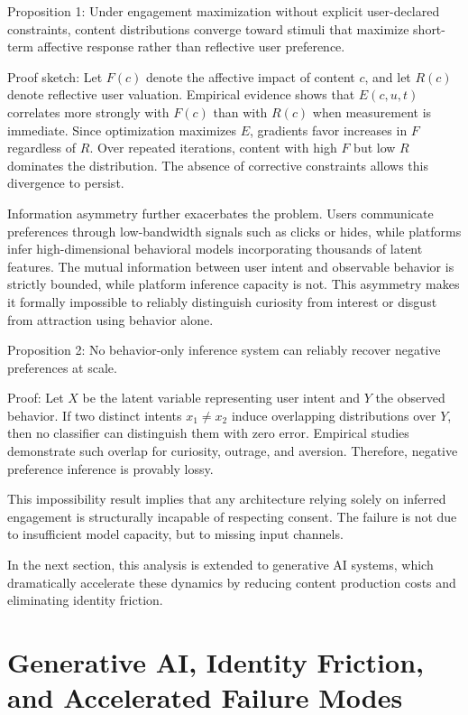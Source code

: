 \documentclass[11pt,oneside]{article}
\begin{document}
Proposition 1: Under engagement maximization without explicit user-declared constraints, content distributions converge toward stimuli that maximize short-term affective response rather than reflective user preference.

Proof sketch: Let \( F(c) \) denote the affective impact of content \( c \), and let \( R(c) \) denote reflective user valuation. Empirical evidence shows that \( E(c,u,t) \) correlates more strongly with \( F(c) \) than with \( R(c) \) when measurement is immediate. Since optimization maximizes \( E \), gradients favor increases in \( F \) regardless of \( R \). Over repeated iterations, content with high \( F \) but low \( R \) dominates the distribution. The absence of corrective constraints allows this divergence to persist.

Information asymmetry further exacerbates the problem. Users communicate preferences through low-bandwidth signals such as clicks or hides, while platforms infer high-dimensional behavioral models incorporating thousands of latent features. The mutual information between user intent and observable behavior is strictly bounded, while platform inference capacity is not. This asymmetry makes it formally impossible to reliably distinguish curiosity from interest or disgust from attraction using behavior alone.

Proposition 2: No behavior-only inference system can reliably recover negative preferences at scale.

Proof: Let \( X \) be the latent variable representing user intent and \( Y \) the observed behavior. If two distinct intents \( x_1 \neq x_2 \) induce overlapping distributions over \( Y \), then no classifier can distinguish them with zero error. Empirical studies demonstrate such overlap for curiosity, outrage, and aversion. Therefore, negative preference inference is provably lossy.

This impossibility result implies that any architecture relying solely on inferred engagement is structurally incapable of respecting consent. The failure is not due to insufficient model capacity, but to missing input channels.

In the next section, this analysis is extended to generative AI systems, which dramatically accelerate these dynamics by reducing content production costs and eliminating identity friction.

\section{Generative AI, Identity Friction, and Accelerated Failure Modes}
\end{document}
